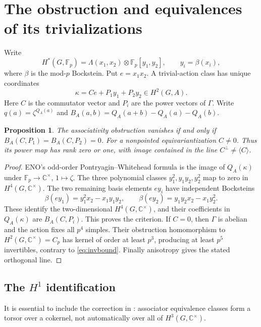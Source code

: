 \documentclass[11pt]{amsart}
\newtheorem{proposition}[theorem]{Proposition}
\theoremstyle{definition}\newtheorem{definition}[theorem]{Definition}
\newcommand{\Fp}{\mathbb F_p}
\newcommand{\C}{\mathbb C}
\begin{document}
\section{The obstruction and equivalences of its trivializations}
Write
\[
H^*(G,\Fp)=\Lambda(x_1,x_2)\otimes\Fp[y_1,y_2],\qquad y_i=\beta(x_i),
\]
where $\beta$ is the mod-$p$ Bockstein. Put $e=x_1x_2$. A trivial-action class
has unique coordinates
\begin{equation}\label{eq:kappa}
\kappa=C e+P_1y_1+P_2y_2\in H^2(G,A).
\end{equation}
Here $C$ is the commutator vector and $P_i$ are the power vectors of $\Gamma$.
Write $q(a)=\zeta^{Q_A(a)}$ and
$B_A(a,b)=Q_A(a+b)-Q_A(a)-Q_A(b)$.

\begin{proposition}\label{prop:obstruction}
The associativity obstruction vanishes if and only if
$B_A(C,P_1)=B_A(C,P_2)=0$.
For a nonpointed equivariantization $C\ne0$. Thus its power map has rank zero
or one, with image contained in the line $C^\perp\ne\langle C\rangle$.
\end{proposition}
\begin{proof}
ENO's odd-order Pontryagin--Whitehead formula
\cite[Proposition 8.13]{ENO} is the image of $Q_A(\kappa)$ under
$\Fp\to\C^\times$, $1\mapsto\zeta$.
The three polynomial classes $y_1^2,y_1y_2,y_2^2$ map to zero in
$H^4(G,\C^\times)$. The two remaining basis elements $ey_i$ have independent
Bocksteins
\[
\beta(ey_1)=y_1^2x_2-x_1y_1y_2,\qquad
\beta(ey_2)=y_1y_2x_2-x_1y_2^2.
\]
These identify the two-dimensional $H^4(G,\C^\times)$, and their coefficients
in $Q_A(\kappa)$ are $B_A(C,P_i)$. This proves the criterion.
If $C=0$, then $\Gamma$ is abelian and the action fixes all $p^4$ simples.
Their obstruction homomorphism to $H^2(G,\C^\times)=C_p$ has kernel of order
at least $p^3$, producing at least $p^5$ invertibles, contrary to
\eqref{eq:invbound}. Finally anisotropy gives the stated orthogonal line.
\end{proof}

\subsection{The $H^1$ identification}
It is essential to include the correction in
\cite[Corollaries 2.25, 2.27 and Remark 8.8]{DN}:
associator equivalence classes form a torsor over a cokernel, not automatically
over all of $H^3(G,\C^\times)$.
\end{document}

